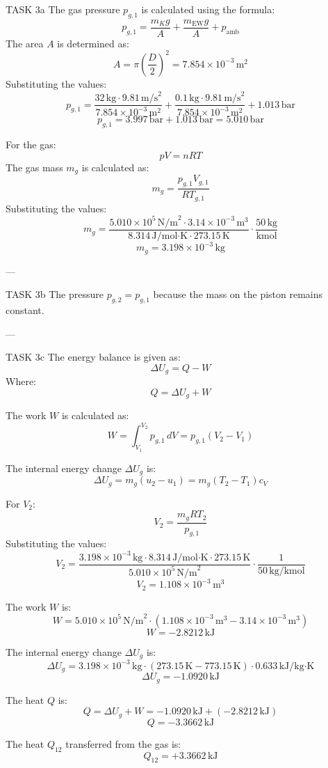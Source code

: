 TASK 3a  
The gas pressure \( p_{g,1} \) is calculated using the formula:  
\[
p_{g,1} = \frac{m_{K} g}{A} + \frac{m_{\text{EW}} g}{A} + p_{\text{amb}}
\]  
The area \( A \) is determined as:  
\[
A = \pi \left(\frac{D}{2}\right)^2 = 7.854 \times 10^{-3} \, \text{m}^2
\]  
Substituting the values:  
\[
p_{g,1} = \frac{32 \, \text{kg} \cdot 9.81 \, \text{m/s}^2}{7.854 \times 10^{-3} \, \text{m}^2} + \frac{0.1 \, \text{kg} \cdot 9.81 \, \text{m/s}^2}{7.854 \times 10^{-3} \, \text{m}^2} + 1.013 \, \text{bar}
\]  
\[
p_{g,1} = 3.997 \, \text{bar} + 1.013 \, \text{bar} = 5.010 \, \text{bar}
\]  

For the gas:  
\[
p V = n R T
\]  
The gas mass \( m_g \) is calculated as:  
\[
m_g = \frac{p_{g,1} V_{g,1}}{R T_{g,1}}
\]  
Substituting the values:  
\[
m_g = \frac{5.010 \times 10^5 \, \text{N/m}^2 \cdot 3.14 \times 10^{-3} \, \text{m}^3}{8.314 \, \text{J/mol·K} \cdot 273.15 \, \text{K}} \cdot \frac{50 \, \text{kg}}{\text{kmol}}
\]  
\[
m_g = 3.198 \times 10^{-3} \, \text{kg}
\]  

---

TASK 3b  
The pressure \( p_{g,2} = p_{g,1} \) because the mass on the piston remains constant.

---

TASK 3c  
The energy balance is given as:  
\[
\Delta U_g = Q - W
\]  
Where:  
\[
Q = \Delta U_g + W
\]  

The work \( W \) is calculated as:  
\[
W = \int_{V_1}^{V_2} p_{g,1} \, dV = p_{g,1} (V_2 - V_1)
\]  

The internal energy change \( \Delta U_g \) is:  
\[
\Delta U_g = m_g (u_2 - u_1) = m_g (T_2 - T_1) c_V
\]  

For \( V_2 \):  
\[
V_2 = \frac{m_g R T_2}{p_{g,1}}
\]  
Substituting the values:  
\[
V_2 = \frac{3.198 \times 10^{-3} \, \text{kg} \cdot 8.314 \, \text{J/mol·K} \cdot 273.15 \, \text{K}}{5.010 \times 10^5 \, \text{N/m}^2} \cdot \frac{1}{50 \, \text{kg/kmol}}
\]  
\[
V_2 = 1.108 \times 10^{-3} \, \text{m}^3
\]  

The work \( W \) is:  
\[
W = 5.010 \times 10^5 \, \text{N/m}^2 \cdot (1.108 \times 10^{-3} \, \text{m}^3 - 3.14 \times 10^{-3} \, \text{m}^3)
\]  
\[
W = -2.8212 \, \text{kJ}
\]  

The internal energy change \( \Delta U_g \) is:  
\[
\Delta U_g = 3.198 \times 10^{-3} \, \text{kg} \cdot (273.15 \, \text{K} - 773.15 \, \text{K}) \cdot 0.633 \, \text{kJ/kg·K}
\]  
\[
\Delta U_g = -1.0920 \, \text{kJ}
\]  

The heat \( Q \) is:  
\[
Q = \Delta U_g + W = -1.0920 \, \text{kJ} + (-2.8212 \, \text{kJ})
\]  
\[
Q = -3.3662 \, \text{kJ}
\]  

The heat \( Q_{12} \) transferred from the gas is:  
\[
Q_{12} = +3.3662 \, \text{kJ}
\]